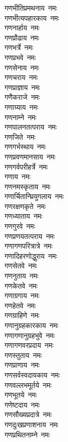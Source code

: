 \begin{multicols}{2}
\begin{flushleft}
गणभीतिप्रमथनाय~नमः\\
गणभीत्यपहारकाय~नमः\\
गणनार्हाय~नमः\\
गणप्रौढाय~नमः\\
गणभर्त्रे~नमः\\
गणप्रभवे~नमः\\
गणसेनाय~नमः\\
गणचराय~नमः\hfill{}\\
गणप्राज्ञाय~नमः\\
गणैकराजे~नमः\\
गणाग्र्याय~नमः\\
गणनाम्ने~नमः\\
गणपालनतत्पराय~नमः\\
गणजिते~नमः\\
गणगर्भस्थाय~नमः\\
गणप्रवणमानसाय~नमः\\
गणगर्वपरीहर्त्रे~नमः\\
गणाय~नमः\hfill{}\\
गणनमस्कृताय~नमः\\
गणार्चितान्घ्रियुगलाय~नमः\\
गणरक्षणकृते~नमः\\
गणध्याताय~नमः\\
गणगुरवे~नमः\\
गणप्रणयतत्पराय~नमः\\
गणागणपरित्रात्रे~नमः\\
गणादिहरणोद्धुराय~नमः\\
गणसेतवे~नमः\\
गणनुताय~नमः\hfill{}\\
गणकेतवे~नमः\\
गणाग्रगाय~नमः\\
गणहेतवे~नमः\\
गणग्राहिणे~नमः\\
गणानुग्रहकारकाय~नमः\\
गणागणानुग्रहभुवे~नमः\\
गणागणवरप्रदाय~नमः\\
गणस्तुताय~नमः\\
गणप्राणाय~नमः\\
गणसर्वस्वदायकाय~नमः\hfill{}\\
गणवल्लभमूर्तये~नमः\\
गणभूतये~नमः\\
गणेष्टदाय~नमः\\
गणसौख्यप्रदात्रे~नमः\\
गणदुःखप्रणाशनाय~नमः\\
गणप्रथितनाम्ने~नमः\\

\end{flushleft}
\end{multicols}
